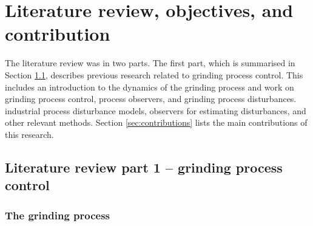 \chapter{Literature review, objectives, and contribution} \label{chap-lit-review}

The literature review was in two parts. The first part, which is summarised in Section \ref{sec:lit-grinding}, describes previous research related to grinding process control. This includes an introduction to the dynamics of the grinding process and work on grinding process control, process observers, and grinding process disturbances.  industrial process disturbance models, observers for estimating disturbances, and other relevant methods. Section \ref{sec:contributions} lists the main contributions of this research.

\section{Literature review part 1 – grinding process control} \label{sec:lit-grinding}

\subsection{The grinding process}

